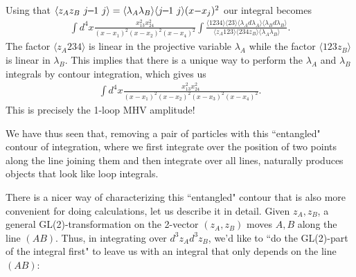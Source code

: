 \documentclass[11pt, reqno]{article}
\newcommand{\be}{\begin{eqnarray}}
\newcommand{\ee}{\end{eqnarray}}
\newcommand{\smallminus}{{\rm\rule[2.4pt]{6pt}{0.65pt}}}
\begin{document}
Using that $\langle z_A z_B\,\,j\smallminus1\,\,j\rangle = \langle \lambda_A \lambda_B\rangle \langle j\smallminus1 \,\, j
\rangle (x {-} x_j)^2$ our integral becomes \be \int
d^4 x \frac{x_{13}^2 x_{24}^2}{(x{-}x_1)^2(x{-}x_2)^2(x{-}x_4)^2}
\int \frac{\langle 1234\rangle \langle 23\rangle \langle \lambda_A d \lambda_A \rangle \langle \lambda_B d \lambda_B \rangle}
  {\langle z_A 123 \rangle \langle 234 z_B \rangle \langle \lambda_A \lambda_B \rangle}.
\ee
The factor $\langle z_A 234\rangle$ is linear in the projective variable $\lambda_A$ while the factor $\langle 123z_B\rangle$ is linear in $\lambda_B$.
This implies that there is a unique way to perform the $\lambda_A$ and $\lambda_B$ integrals by contour integration, which gives us
\be \int  d^4 x \frac{x_{13}^2 x_{24}^2}{(x-x_1)^2(x-x_2)^2(x-x_3)^2(x-x_4)^2}.
\ee
This is precisely the 1-loop MHV amplitude!

We have thus seen that, removing a pair of particles with this ``entangled" contour of integration, where we first integrate over the position of two points along the line joining them and then integrate over all lines, naturally produces objects that look like loop integrals.

There is a nicer way of characterizing this ``entangled" contour that is also more convenient for doing calculations, let us describe it in detail.
Given $z_A,z_B$, a general GL(2)-transformation on the 2-vector $(z_A,z_B)$ moves $A,B$ along the line $(AB)$. Thus, in integrating over $d^3z_A d^3z_B$, we'd like to ``do the GL(2)-part of the integral first" to leave us with an integral that only depends on the line $(AB)$:\vspace{-0.5cm}
\end{document}
